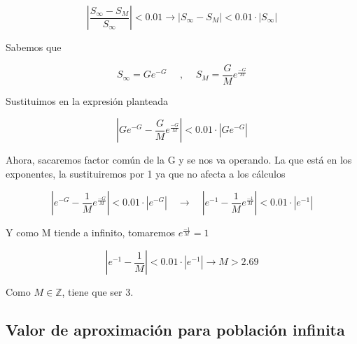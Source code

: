 \documentclass{article}
\begin{document}
$$\left| \frac{S_{\infty} - S_M}{S_{\infty}} \right| < 0.01 \rightarrow \left| S_{\infty} - S_M \right| < 0.01 \cdot \left| S_{\infty}\right|$$

Sabemos que 

$$ S_{\infty} = Ge^{-G} \quad \text{ , } \quad S_M = \frac{G}{M}e^{\frac{-G}{M}} $$

Sustituimos en la expresión planteada

$$\left| Ge^{-G} - \frac{G}{M}e^{\frac{-G}{M}} \right| < 0.01 \cdot \left| Ge^{-G}\right|$$

Ahora, sacaremos factor común de la G y se nos va operando. La que está en los exponentes, la sustituiremos por 1 ya que no afecta a los cálculos

$$\left| e^{-G} - \frac{1}{M}e^{\frac{-G}{M}} \right| < 0.01 \cdot \left| e^{-G}\right| \quad \rightarrow \quad \left| e^{-1} - \frac{1}{M}e^{\frac{-1}{M}} \right| < 0.01 \cdot \left| e^{-1}\right| $$

Y como M tiende a infinito, tomaremos $e^{\frac{-1}{M}} = 1$

$$\left| e^{-1} - \frac{1}{M} \right| < 0.01 \cdot \left| e^{-1}\right| \rightarrow M > 2.69$$

Como $M \in \mathbb{Z}$, tiene que ser 3.

\subsection{Valor de aproximación para población infinita}
\end{document}
